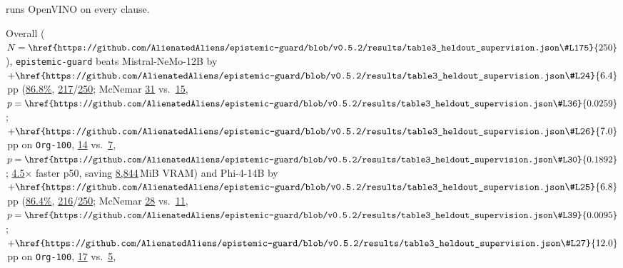 \documentclass[10pt,twocolumn]{article}
\begin{document}
runs OpenVINO on every clause.

Overall ($N=\href{https://github.com/AlienatedAliens/epistemic-guard/blob/v0.5.2/results/table3_heldout_supervision.json\#L175}{250}$), \texttt{epistemic-guard} beats Mistral-NeMo-12B by $+\href{https://github.com/AlienatedAliens/epistemic-guard/blob/v0.5.2/results/table3_heldout_supervision.json\#L24}{6.4}$\,pp (\href{https://github.com/AlienatedAliens/epistemic-guard/blob/v0.5.2/results/table3_heldout_supervision.json\#L161}{86.8\%}, \href{https://github.com/AlienatedAliens/epistemic-guard/blob/v0.5.2/results/table3_heldout_supervision.json\#L164}{217}/\href{https://github.com/AlienatedAliens/epistemic-guard/blob/v0.5.2/results/table3_heldout_supervision.json\#L175}{250}; McNemar \href{https://github.com/AlienatedAliens/epistemic-guard/blob/v0.5.2/results/table3_heldout_supervision.json\#L35}{31} vs.\ \href{https://github.com/AlienatedAliens/epistemic-guard/blob/v0.5.2/results/table3_heldout_supervision.json\#L34}{15}, $p=\href{https://github.com/AlienatedAliens/epistemic-guard/blob/v0.5.2/results/table3_heldout_supervision.json\#L36}{0.0259}$; $+\href{https://github.com/AlienatedAliens/epistemic-guard/blob/v0.5.2/results/table3_heldout_supervision.json\#L26}{7.0}$\,pp on \texttt{Org-100}, \href{https://github.com/AlienatedAliens/epistemic-guard/blob/v0.5.2/results/table3_heldout_supervision.json\#L29}{14} vs.\ \href{https://github.com/AlienatedAliens/epistemic-guard/blob/v0.5.2/results/table3_heldout_supervision.json\#L28}{7}, $p=\href{https://github.com/AlienatedAliens/epistemic-guard/blob/v0.5.2/results/table3_heldout_supervision.json\#L30}{0.1892}$; \href{https://github.com/AlienatedAliens/epistemic-guard/blob/v0.5.2/results/table3_heldout_supervision.json\#L40}{4.5}$\times$ faster p50, saving \href{https://github.com/AlienatedAliens/epistemic-guard/blob/v0.5.2/results/table3_heldout_supervision.json\#L166}{8,844}\,MiB VRAM) and Phi-4-14B by $+\href{https://github.com/AlienatedAliens/epistemic-guard/blob/v0.5.2/results/table3_heldout_supervision.json\#L25}{6.8}$\,pp (\href{https://github.com/AlienatedAliens/epistemic-guard/blob/v0.5.2/results/table3_heldout_supervision.json\#L177}{86.4\%}, \href{https://github.com/AlienatedAliens/epistemic-guard/blob/v0.5.2/results/table3_heldout_supervision.json\#L180}{216}/\href{https://github.com/AlienatedAliens/epistemic-guard/blob/v0.5.2/results/table3_heldout_supervision.json\#L175}{250}; McNemar \href{https://github.com/AlienatedAliens/epistemic-guard/blob/v0.5.2/results/table3_heldout_supervision.json\#L38}{28} vs.\ \href{https://github.com/AlienatedAliens/epistemic-guard/blob/v0.5.2/results/table3_heldout_supervision.json\#L37}{11}, $p=\href{https://github.com/AlienatedAliens/epistemic-guard/blob/v0.5.2/results/table3_heldout_supervision.json\#L39}{0.0095}$; $+\href{https://github.com/AlienatedAliens/epistemic-guard/blob/v0.5.2/results/table3_heldout_supervision.json\#L27}{12.0}$\,pp on \texttt{Org-100}, \href{https://github.com/AlienatedAliens/epistemic-guard/blob/v0.5.2/results/table3_heldout_supervision.json\#L32}{17} vs.\ \href{https://github.com/AlienatedAliens/epistemic-guard/blob/v0.5.2/results/table3_heldout_supervision.json\#L31}{5}, 
\end{document}
